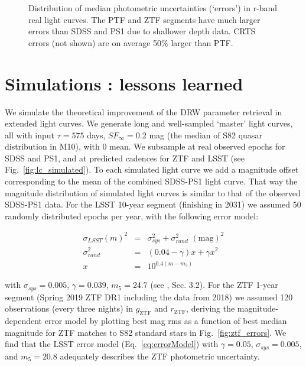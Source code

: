 \documentclass[twocolumn]{aastex62}
\begin{document}
\begin{figure}%
\caption{Distribution of median photometric uncertainties (`errors') in r-band real light curves. The PTF and ZTF segments have much larger errors than SDSS and PS1 due to shallower depth data. CRTS errors (not shown) are on average 50\% larger than PTF.}
\label{fig:lc_errors}
\end{figure} 

%
%
%
%
%

\section{Simulations : lessons learned}\label{sec:simulation}

We simulate the theoretical improvement of the DRW parameter retrieval in extended light curves. We generate long and well-sampled  `master' light curves, all with input $\tau = 575 $ days, $SF_{\infty} = 0.2$ mag (the median of S82 quasar distribution in M10), with 0 mean.  We subsample at real observed epochs for SDSS and PS1, and at predicted cadences for ZTF and LSST  (see Fig.~\ref{fig:lc_simulated}). To each simulated light curve we add a magnitude offset corresponding to the mean of the combined SDSS-PS1 light curve. That way the magnitude distribution of simulated light curves is similar to that of the observed SDSS-PS1 data. For the LSST 10-year segment (finishing in 2031) we assumed 50 randomly distributed  epochs per year, with the following error model:

\begin{eqnarray}
\label{eq:errorModel}
\sigma_{LSST}(m)^{2} &=& \sigma_{sys}^{2} + \sigma_{rand}^{2} \,\, \mathrm{(mag)}^{2} \\
\sigma_{rand}^{2} &=& (0.04-\gamma)x + \gamma x^{2} \nonumber \\
x &=& 10^{0.4(m-m_{5})} \nonumber
\end{eqnarray}

with  $\sigma_{sys} = 0.005$, $\gamma=0.039$, $m_{5} = 24.7$ (see \citealt{ivezic2019}, Sec. 3.2).
For the ZTF 1-year segment (Spring 2019 ZTF DR1 including the data from 2018) we assumed 120 observations (every three nights) in $g_{\mathrm{ZTF}}$ and $r_{\mathrm{ZTF}}$, deriving the magnitude-dependent error model by plotting best mag rms as a function of best median magnitude for ZTF matches to S82 standard stars in Fig.~\ref{fig:ztf_errors}. We find that the LSST error model (Eq.~\ref{eq:errorModel}) with $\gamma = 0.05$, $\sigma_{sys} = 0.005 $, and $m_{5} = 20.8$ adequately describes the ZTF photometric uncertainty. 
\end{document}
